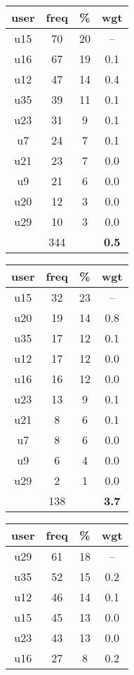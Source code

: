 
\begin{table}
\centering
\begin{tabular}{ |c|c|c|c| }
	\hline
	\textbf{user} & \textbf{freq} & \textbf{\%} & \textbf{wgt} \\
	\hline
	u15 & 70 & 20 & -- \\
	u16 & 67 & 19 & 0.1 \\
	u12 & 47 & 14 & 0.4 \\
	u35 & 39 & 11 & 0.1 \\
	u23 & 31 & 9 & 0.1 \\
	u7 & 24 & 7 & 0.1 \\
	u21 & 23 & 7 & 0.0 \\
	u9 & 21 & 6 & 0.0 \\
	u20 & 12 & 3 & 0.0 \\
	u29 & 10 & 3 & 0.0 \\
	 & 344 & & \textbf{0.5} \\
	\hline
\end{tabular}
\begin{tabular}{ |c|c|c|c| }
	\hline
	\textbf{user} & \textbf{freq} & \textbf{\%} & \textbf{wgt} \\
	\hline
	u15 & 32 & 23 & -- \\
	u20 & 19 & 14 & 0.8 \\
	u35 & 17 & 12 & 0.1 \\
	u12 & 17 & 12 & 0.0 \\
	u16 & 16 & 12 & 0.0 \\
	u23 & 13 & 9 & 0.1 \\
	u21 & 8 & 6 & 0.1 \\
	u7 & 8 & 6 & 0.0 \\
	u9 & 6 & 4 & 0.0 \\
	u29 & 2 & 1 & 0.0 \\
	 & 138 & & \textbf{3.7} \\
	\hline
\end{tabular}
\begin{tabular}{ |c|c|c|c| }
	\hline
	\textbf{user} & \textbf{freq} & \textbf{\%} & \textbf{wgt} \\
	\hline
	u29 & 61 & 18 & -- \\
	u35 & 52 & 15 & 0.2 \\
	u12 & 46 & 14 & 0.1 \\
	u15 & 45 & 13 & 0.0 \\
	u23 & 43 & 13 & 0.0 \\
	u16 & 27 & 8 & 0.2 \\

\end{tabular}
\end{table}
